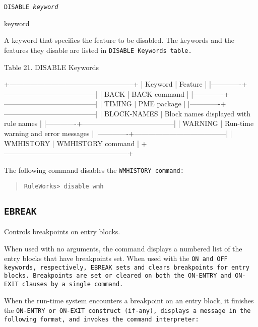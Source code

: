 \Format

\tt{DISABLE} \it{keyword}

\begin{arguments}
\item[keyword]

  A keyword that specifies the feature to be disabled. The keywords
  and the features they disable are listed in \tt{DISABLE} Keywords
  table.
\end{arguments}

Table 21. DISABLE Keywords

+-----------------------------------------------------+
| Keyword     | Feature                               |
|-------------+---------------------------------------|
| BACK        | BACK command                          |
|-------------+---------------------------------------|
| TIMING      | PME package                           |
|-------------+---------------------------------------|
| BLOCK-NAMES | Block names displayed with rule names |
|-------------+---------------------------------------|
| WARNING     | Run-time warning and error messages   |
|-------------+---------------------------------------|
| WMHISTORY   | WMHISTORY command                     |
+-----------------------------------------------------+

\Example

The following command disables the \tt{WMHISTORY} command:

\begin{quote}
\begin{verbatim}
RuleWorks> disable wmh
\end{verbatim}
\end{quote}


\subsection{\tt{EBREAK}}

Controls breakpoints on entry blocks.

When used with no arguments, the command displays a numbered list of
the entry blocks that have breakpoints set. When used with the \tt{ON}
and \tt{OFF} keywords, respectively, \tt{EBREAK} sets and clears
breakpoints for entry blocks. Breakpoints are set or cleared on both
the \tt{ON-ENTRY} and \tt{ON-EXIT} clauses by a single command.

When the run-time system encounters a breakpoint on an entry block, it
finishes the \tt{ON-ENTRY} or \tt{ON-EXIT} construct (if-any),
displays a message in the following format, and invokes the command
interpreter:

